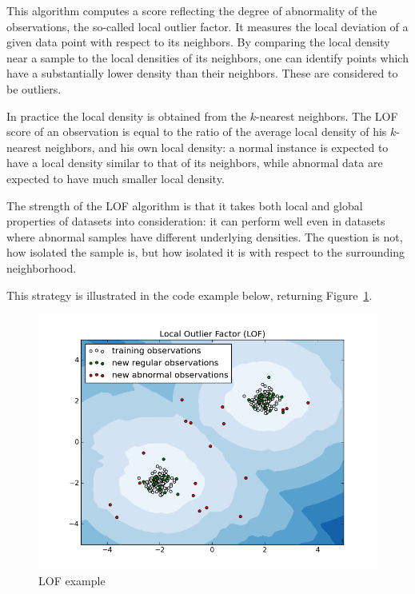 This algorithm computes a score reflecting the degree of abnormality of the observations, the so-called local outlier factor. It measures the local deviation of a given data point with respect to its neighbors. By comparing the local density near a sample to the local densities of its neighbors, one can identify points which have a substantially lower density than their neighbors. These are considered to be outliers.

In practice the local density is obtained from the $k$-nearest neighbors. The LOF score of an observation is equal to the ratio of the average local density of his $k$-nearest neighbors, and his own local density: a normal instance is expected to have a local density similar to that of its neighbors, while abnormal data are expected to have much smaller local density.

The strength of the LOF algorithm is that it takes both local and global properties of datasets into consideration: it can perform well even in datasets where abnormal samples have different underlying densities. The question is not, how isolated the sample is, but how isolated it is with respect to the surrounding neighborhood.

This strategy is illustrated in the code example below, returning Figure~\ref{fig:lof}.
\begin{figure}[!h]
  \includegraphics[width=0.9\linewidth]{fig_source/lof}
  \caption{LOF example}
  \label{fig:lof}
\end{figure}

